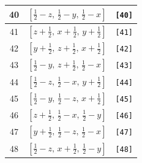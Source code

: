\documentclass[fleqn,8pt]{jsarticle}
\begin{document}
\begin{longtable}{ccc}
40 & $\left[ \frac{1}{2} - z,\, \frac{1}{2} - y,\, \frac{1}{2} - x \right]$ & {\tt [40]} \\ \hline
41 & $\left[ z + \frac{1}{2},\, x + \frac{1}{2},\, y + \frac{1}{2} \right]$ & {\tt [41]} \\ \hline
42 & $\left[ y + \frac{1}{2},\, z + \frac{1}{2},\, x + \frac{1}{2} \right]$ & {\tt [42]} \\ \hline
43 & $\left[ \frac{1}{2} - y,\, z + \frac{1}{2},\, \frac{1}{2} - x \right]$ & {\tt [43]} \\ \hline
44 & $\left[ \frac{1}{2} - z,\, \frac{1}{2} - x,\, y + \frac{1}{2} \right]$ & {\tt [44]} \\ \hline
45 & $\left[ \frac{1}{2} - y,\, \frac{1}{2} - z,\, x + \frac{1}{2} \right]$ & {\tt [45]} \\ \hline
46 & $\left[ z + \frac{1}{2},\, \frac{1}{2} - x,\, \frac{1}{2} - y \right]$ & {\tt [46]} \\ \hline
47 & $\left[ y + \frac{1}{2},\, \frac{1}{2} - z,\, \frac{1}{2} - x \right]$ & {\tt [47]} \\ \hline
48 & $\left[ \frac{1}{2} - z,\, x + \frac{1}{2},\, \frac{1}{2} - y \right]$ & {\tt [48]} \\
\end{longtable}
\end{document}
